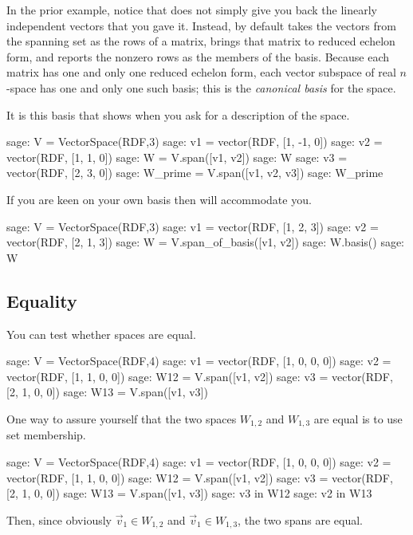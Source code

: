 In the prior example, notice that \Sage{} does not simply
give you back the linearly independent
vectors that you gave it.
Instead, by default \Sage{} takes the vectors from the spanning set 
as the rows of a matrix,
brings that matrix to reduced echelon form, and reports the nonzero 
rows as the members of the basis.
Because each matrix has one and only one reduced echelon form, each 
vector subspace of real $n$-space has one and only one such
basis;
this is the \textit{canonical basis} for the space.

It is this basis that \Sage{} shows when you ask for a description
of the space.
\begin{sagecommandline}
sage: V = VectorSpace(RDF,3)               
sage: v1 = vector(RDF, [1, -1, 0]) 
sage: v2 = vector(RDF, [1, 1, 0]) 
sage: W = V.span([v1, v2])       
sage: W
sage: v3 = vector(RDF, [2, 3, 0])
sage: W_prime = V.span([v1, v2, v3])
sage: W_prime
\end{sagecommandline}

If you are keen on your own basis then \Sage{} will
accommodate you.
\begin{sagecommandline}
sage: V = VectorSpace(RDF,3)
sage: v1 = vector(RDF, [1, 2, 3])
sage: v2 = vector(RDF, [2, 1, 3])
sage: W = V.span_of_basis([v1, v2])
sage: W.basis()
sage: W
\end{sagecommandline}




\subsection{Equality}

You can test whether spaces are equal.
\begin{sagecommandline}
sage: V = VectorSpace(RDF,4)
sage: v1 = vector(RDF, [1, 0, 0, 0])
sage: v2 = vector(RDF, [1, 1, 0, 0])
sage: W12 = V.span([v1, v2])
sage: v3 = vector(RDF, [2, 1, 0, 0])
sage: W13 = V.span([v1, v3])  
\end{sagecommandline}
\noindent
One way to assure yourself that the two spaces $W_{1,2}$ and $W_{1,3}$ 
are equal is to use set membership.
\begin{sagecommandline}
sage: V = VectorSpace(RDF,4)
sage: v1 = vector(RDF, [1, 0, 0, 0])
sage: v2 = vector(RDF, [1, 1, 0, 0])
sage: W12 = V.span([v1, v2])
sage: v3 = vector(RDF, [2, 1, 0, 0])
sage: W13 = V.span([v1, v3])  
sage: v3 in W12
sage: v2 in W13
\end{sagecommandline}
\noindent
Then, since obviously $\vec{v}_1\in W_{1,2}$ and $\vec{v}_1\in W_{1,3}$, the two
spans are equal.

